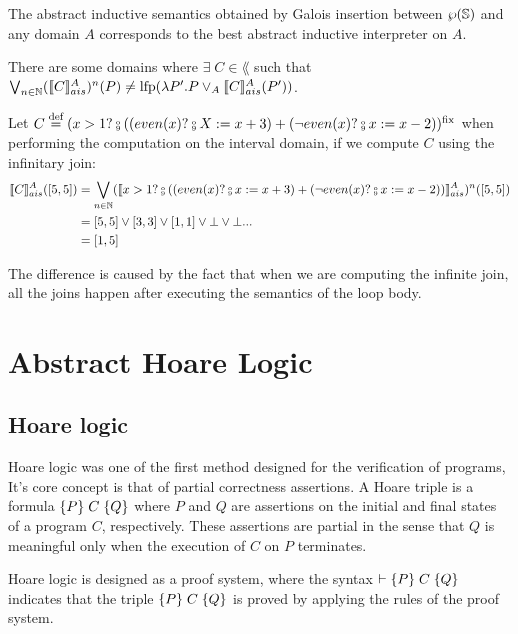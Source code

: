\documentclass[
  10pt,       %
  twoside,    %
  a4paper,    %
  english,    %
  tikz,       %
  openright,  %
]{book}
\begin{document}
The abstract inductive semantics obtained by Galois insertion between 
$\wp(\mathbb{S})$ and any domain $A$ corresponds to the best abstract inductive 
interpreter on $A$.

\begin{observation}
  \label{obs:abstract-fix}
  There are some domains where $\exists \; C \in \lang$ such that
  $\bigvee_{n \in \mathbb{N}} (\llbracket C \rrbracket_{ais}^{A})^n(P) \neq \mathrm{lfp}(\lambda P'. P \lor_A
  \llbracket C \rrbracket_{ais}^{A}(P'))$.
\end{observation}
\begin{example}
  Let $C \defeq (x > 1? \fcmp ((even(x) ? \fcmp X := x + 3) +
  (\neg even(x)? \fcmp x := x - 2))^\fix$ when performing the computation on
  the interval domain, if we compute $C$ using the infinitary join:
  \begin{align*}
    \asem{C}([5, 5])
      &= \bigvee_{n \in \mathbb{N}} (\asem{x > 1? \fcmp ((even(x) ? \fcmp x :=
        x + 3) + (\neg even(x)? \fcmp x := x - 2))})^n([5, 5]) \\
      &= [5, 5] \join [3, 3] \join [1, 1] \join \bot \join \bot ... \\
      &= [1, 5]
  \end{align*}

  The difference is caused by the fact that when we are computing the infinite 
  join, all the joins happen after executing the semantics of the loop body.
  
\end{example}
\section{Abstract Hoare Logic}
\label{chp:intro-ahorare}

\subsection{Hoare logic}
Hoare logic  \cite{Hoare69, Floyd93} was one of the first method designed for 
the verification of programs, It's core concept is that of partial correctness 
assertions. A Hoare triple is a formula $\{ P \} \; C \; \{ Q \}$ where $P$ and $Q$ are 
assertions on the initial and final states of a program $C$, respectively. 
These assertions are partial in the sense that $Q$ is meaningful only when the 
execution of $C$ on $P$ terminates.

Hoare logic is designed as a proof system, where the syntax 
$\vdash \{ P \} \; C \; \{ Q \}$ indicates that the triple 
$\{ P \} \; C \; \{ Q \}$ is proved by applying the rules of the proof system.
\end{document}

